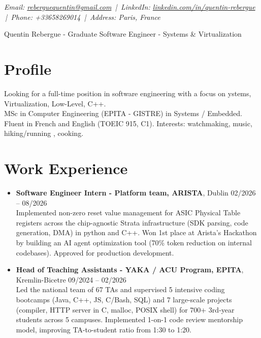 \documentclass[9pt,a4paper]{article}
\newcommand{\namefont}{\fontsize{20}{22}\selectfont}
\newcommand{\tinyscript}{\fontsize{8}{9}\selectfont}
\begin{document}
\renewcommand\normalsize{\fontsize{10.5}{15}\selectfont}
\normalsize

\begin{center}
  {\tinyscript\itshape
  Email: \href{mailto:reberguequentin@gmail.com}{reberguequentin@gmail.com} \,|\,
  LinkedIn: \href{https://linkedin.com/in/quentin-rebergue}{linkedin.com/in/quentin-rebergue} \,|\,
  Phone: +33658269014 \,|\,
  Address: Paris, France}
\end{center}

\begin{center}
  {\namefont Quentin Rebergue - Graduate Software Engineer - Systems \& Virtualization}
\end{center}

\section*{Profile}
\begin{tcolorbox}[mybox2]
Looking for a full-time position in software engineering with a focus on ystems, Virtualization, Low-Level, C++.\\[0.3em]
MSc in Computer Engineering (EPITA - GISTRE) in Systems / Embedded.\\[0.3em]
Fluent in French and English (TOEIC 915, C1). Interests: watchmaking, music, hiking/running , cooking.
\end{tcolorbox}

\section*{Work Experience}
\begin{tcolorbox}[mybox]
\begin{itemize}
\item\textbf{Software Engineer Intern - Platform team, ARISTA}, Dublin \hfill {\small02/2026 – 08/2026}\\[0.5em]
\textcolor{gray!40!black}{Implemented non-zero reset value management for ASIC Physical Table registers across the chip-agnostic Strata infrastructure (SDK parsing, code generation, DMA) in python and C++.
Won 1st place at Arista's Hackathon by building an AI agent optimization tool (70\% token reduction on internal codebases). Approved for production development.}

\item\textbf{Head of Teaching Assistants - YAKA / ACU Program, EPITA}, Kremlin-Bicetre \hfill {\small09/2024 – 02/2026}\\[0.5em]
\textcolor{gray!40!black}{Led the national team of 67 TAs and supervised 5 intensive coding bootcamps (Java, C++, JS, C/Bash, SQL) and 7 large-scale projects (compiler, HTTP server in C, malloc, POSIX shell) for 700+ 3rd-year students across 5 campuses. Implemented 1-on-1 code review mentorship model, improving TA-to-student ratio from 1:30 to 1:20.}
\end{itemize}
\end{tcolorbox}
\end{document}
